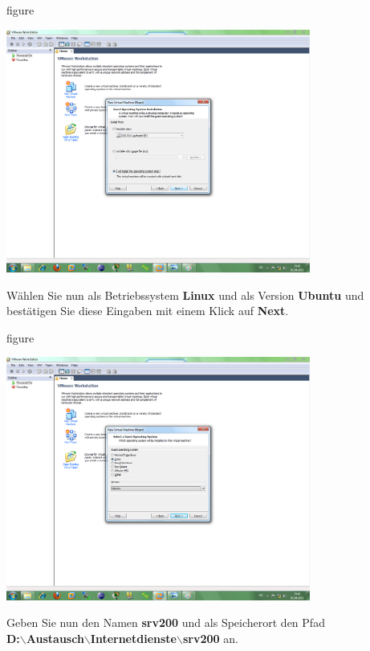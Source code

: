 \begin{nofloat}{figure}
\begin{center}
\includegraphics[width=0.75\textwidth]{screenshots/vm03.png}
\end{center}
\end{nofloat}

Wählen Sie nun als Betriebssystem \textbf{Linux} und als Version \textbf{Ubuntu} und bestätigen Sie diese
Eingaben mit einem Klick auf \textbf{Next}.

\begin{nofloat}{figure}
\begin{center}
\includegraphics[width=0.75\textwidth]{screenshots/vm04.png}
\end{center}
\end{nofloat}

Geben Sie nun den Namen \textbf{srv200} und als Speicherort den Pfad \\
\textbf{D:$\backslash$Austausch$\backslash$Internetdienste$\backslash$srv200}
an.

